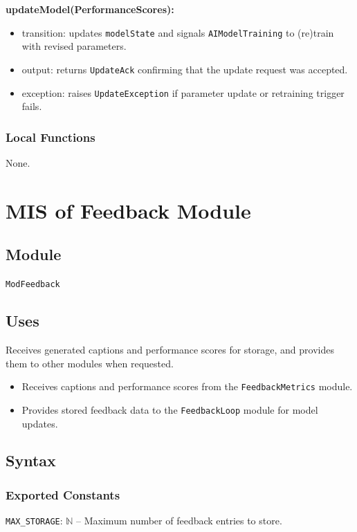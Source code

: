 \documentclass[12pt, titlepage]{article}
\begin{document}
\noindent \textbf{updateModel(PerformanceScores):}
\begin{itemize}
  \item transition: updates \texttt{modelState} and signals \texttt{AIModelTraining} to (re)train with revised parameters.
  \item output: returns \texttt{UpdateAck} confirming that the update request was accepted.
  \item exception: raises \texttt{UpdateException} if parameter update or retraining trigger fails.
\end{itemize}

\subsubsection{Local Functions}
None.
\section{MIS of Feedback Module} \label{modfeedback}

\subsection{Module}
\texttt{ModFeedback}

\subsection{Uses}
Receives generated captions and performance scores for storage, and provides them to other modules when requested.
\begin{itemize}
  \item Receives captions and performance scores from the \texttt{FeedbackMetrics} module.
  \item Provides stored feedback data to the \texttt{FeedbackLoop} module for model updates.
\end{itemize}

\subsection{Syntax}

\subsubsection{Exported Constants}
\texttt{MAX\_STORAGE}: $\mathbb{N}$ -- Maximum number of feedback entries to store.
\end{document}
